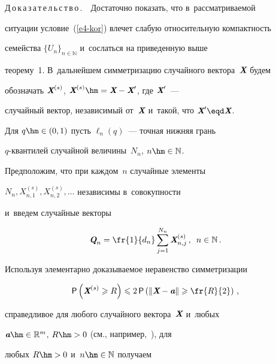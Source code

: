 \smallskip





\noindent


Д\,о\,к\,а\,з\,а\,т\,е\,л\,ь\,с\,т\,в\,о\,.\ \ Достаточно показать, что в~рассматриваемой


ситуации условие~(\ref{e4-kor}) влечет слабую относительную компактность


семейства $\{U_n\}_{n\in\mathbb{N}}$ и~сослаться на приведенную выше


теорему~1. В~дальнейшем симметризацию случайного вектора~$\emph{\textbf{X}}$ будем


обозначать $\emph{\textbf{X}}^{(s)}$, $\vX^{(s)}\hm= \vX-\vX'$, где $\emph{\textbf{X}}'$~---


случайный вектор, независимый от~$\emph{\textbf{X}}$ и~такой, что $\vX'\eqd \vX$.


Для $q\hm\in(0,1)$ пусть $\ell_n(q)$~--- точная нижняя грань


$q$-кван\-ти\-лей случайной величины~$N_n$, $n\hm\in\mathbb{N}$.


Предположим, что при каждом~$n$ случайные элементы


$N_n,X_{n,1}^{(s)},X_{n,2}^{(s)},\ldots$ независимы в~совокупности


и~введем случайные векторы





\noindent


$$


\vQ_n=\fr{1}{d_n}\sum\limits_{j=1}^{N_n}\vX_{n,j}^{(s)}\,,\enskip


n\in\mathbb{N}\,.


$$


Используя элементарно доказываемое неравенство симметризации





\noindent


$$


{\sf P}\left(\vX^{(s)}\geqslant R\right)\leqslant 2\,{\sf


P}\left(\|\vX-\va\|\geqslant\fr{R}{2}\right)\,,


$$


справедливое для любого случайного вектора~$\emph{\textbf{X}}$ и~любых


$\va\hm\in\mathbb{R}^m$, $R\hm>0$ (см., например,~\cite{Kruglov1973}), для


любых $R\hm>0$ и~$n\hm\in\mathbb{N}$ получаем





